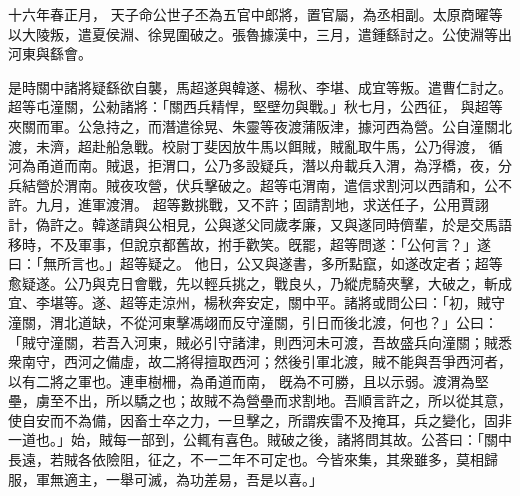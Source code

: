 \begin{pinyinscope}
十六年春正月，
天子命公世子丕為五官中郎將，置官屬，為丞相副。太原商曜等以大陵叛，遣夏侯淵、徐晃圍破之。張魯據漢中，三月，遣鍾繇討之。公使淵等出河東與繇會。


是時關中諸將疑繇欲自襲，馬超遂與韓遂、楊秋、李堪、成宜等叛。遣曹仁討之。超等屯潼關，公勑諸將：「關西兵精悍，堅壁勿與戰。」秋七月，公西征，
與超等夾關而軍。公急持之，而潛遣徐晃、朱靈等夜渡蒲阪津，據河西為營。公自潼關北渡，未濟，超赴船急戰。校尉丁斐因放牛馬以餌賊，賊亂取牛馬，公乃得渡，
循河為甬道而南。賊退，拒渭口，公乃多設疑兵，潛以舟載兵入渭，為浮橋，夜，分兵結營於渭南。賊夜攻營，伏兵擊破之。超等屯渭南，遣信求割河以西請和，公不許。九月，進軍渡渭。
超等數挑戰，又不許；固請割地，求送任子，公用賈詡計，偽許之。韓遂請與公相見，公與遂父同歲孝廉，又與遂同時儕輩，於是交馬語移時，不及軍事，但說京都舊故，拊手歡笑。旣罷，超等問遂：「公何言？」遂曰：「無所言也。」超等疑之。
他日，公又與遂書，多所點竄，如遂改定者；超等愈疑遂。公乃與克日會戰，先以輕兵挑之，戰良乆，乃縱虎騎夾擊，大破之，斬成宜、李堪等。遂、超等走涼州，楊秋奔安定，關中平。諸將或問公曰：「初，賊守潼關，渭北道缺，不從河東擊馮翊而反守潼關，引日而後北渡，何也？」公曰：「賊守潼關，若吾入河東，賊必引守諸津，則西河未可渡，吾故盛兵向潼關；賊悉衆南守，西河之備虛，故二將得擅取西河；然後引軍北渡，賊不能與吾爭西河者，以有二將之軍也。連車樹柵，為甬道而南，
旣為不可勝，且以示弱。渡渭為堅壘，虜至不出，所以驕之也；故賊不為營壘而求割地。吾順言許之，所以從其意，使自安而不為備，因畜士卒之力，一旦擊之，所謂疾雷不及掩耳，兵之變化，固非一道也。」始，賊每一部到，公輒有喜色。賊破之後，諸將問其故。公荅曰：「關中長遠，若賊各依險阻，征之，不一二年不可定也。今皆來集，其衆雖多，莫相歸服，軍無適主，一舉可滅，為功差易，吾是以喜。」



\end{pinyinscope}

